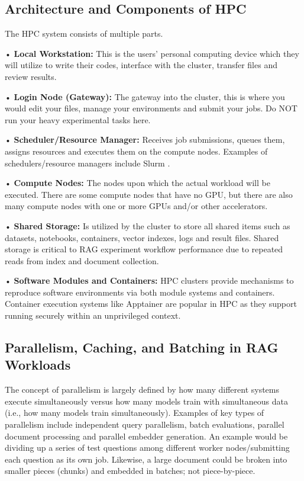 \subsection{Architecture and Components of HPC}

The HPC system consists of multiple parts.

• \textbf{Local Workstation:} This is the users' personal computing device which they will utilize to write their codes, interface with the cluster, transfer files and review results.

• \textbf{Login Node (Gateway):} The gateway into the cluster, this is where you would edit your files, manage your environments and submit your jobs. Do NOT run your heavy experimental tasks here.

• \textbf{Scheduler/Resource Manager:} Receives job submissions, queues them, assigns resources and executes them on the compute nodes. Examples of schedulers/resource managers include Slurm .

• \textbf{Compute Nodes:} The nodes upon which the actual workload will be executed. There are some compute nodes that have no \ac{GPU}, but there are also many compute nodes with one or more \acp{GPU} and/or other accelerators.

• \textbf{Shared Storage:} Is utilized by the cluster to store all shared items such as datasets, notebooks, containers, vector indexes, logs and result files. Shared storage is critical to \ac{RAG} experiment workflow performance due to repeated reads from index and document collection.

• \textbf{Software Modules and Containers:} \ac{HPC} clusters provide mechanisms to reproduce software environments via both module systems and containers. Container execution systems like Apptainer  are popular in \ac{HPC} as they support running securely within an unprivileged context.

\subsection{Parallelism, Caching, and Batching in RAG Workloads}

The concept of parallelism is largely defined by how many different systems execute simultaneously versus how many models train with simultaneous data (i.e., how many models train simultaneously). Examples of key types of parallelism include independent query parallelism, batch evaluations, parallel document processing and parallel embedder generation. An example would be dividing up a series of test questions among different worker nodes/submitting each question as its own job. Likewise, a large document could be broken into smaller pieces (chunks) and embedded in batches; not piece-by-piece.


